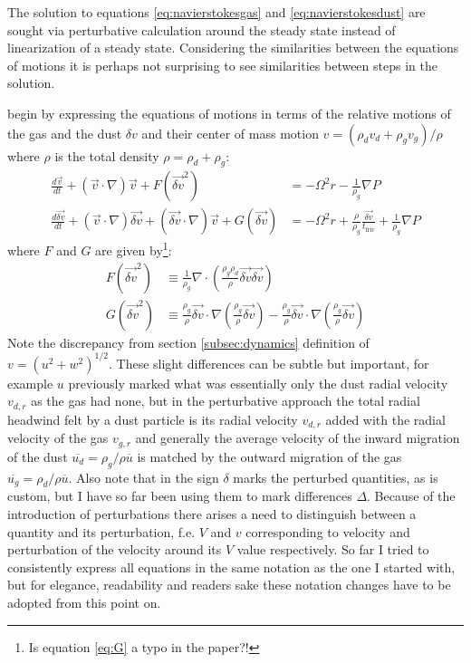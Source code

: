 \documentclass[12pt]{article}
\begin{document}
The solution to equations \ref{eq:navierstokesgas} and \ref{eq:navierstokesdust} are sought via perturbative calculation around the steady state instead of linearization of a steady state. Considering the similarities between the equations of motions it is perhaps not surprising to see similarities between steps in the solution. 

\cite{Youdin05} begin by expressing the equations of motions in terms of the relative motions of the gas and the dust $\delta v$ and their center of mass motion $v = (\rho_dv_d+\rho_gv_g)/\rho$ where $\rho$ is the total density $\rho = \rho_d+\rho_g$:
\begin{align}
    \label{eq:comnavierstokesgas}
    \frac{d \vec{v}}{dt} + (\vec{v}\cdot \nabla)\vec{v} + F(\vec{\delta v}^2) 
    &= -\Omega^2r - \frac{1}{\rho_g } \nabla P \\
    \label{eq:comnavierstokesdust}
    \frac{d \vec{\delta v}}{dt} + (\vec{v}\cdot \nabla)\vec{\delta v} + (\vec{\delta v}\cdot \nabla)\vec{v} + G(\vec{\delta v})
    &= -\Omega^2r + \frac{\rho}{\rho_g}\frac{\vec{\delta v}}{t_\mathrm{fric}} + \frac{1}{\rho_g } \nabla P
\end{align}
where $F$ and $G$ are given by\footnote{Is equation \ref{eq:G} a typo in the paper?!}:
\begin{align}
    \label{eq:F}
     F(\vec{\delta v}^2) &\equiv \frac{1}{\rho_g } \nabla \cdot \left( \frac{\rho_g\rho_d}{\rho} \vec{\delta v} \vec{\delta v} \right) \\
    \label{eq:G}
     G(\vec{\delta v}^2) &\equiv \frac{\rho_g}{\rho}\vec{\delta v} \cdot \nabla\left( \frac{\rho_g}{\rho}\vec{\delta v} \right) - \frac{\rho_g}{\rho}\vec{\delta v} \cdot \nabla\left( \frac{\rho_g}{\rho}\vec{\delta v} \right) 
\end{align}
Note the discrepancy from section \ref{subsec:dynamics} definition of $v=(u^2+w^2)^{1/2}$. These slight differences can be subtle but important, for example $u$ previously marked what was essentially only the dust radial velocity $v_{d,r}$ as the gas had none, but in the perturbative approach the total radial headwind felt by a dust particle is its radial velocity $v_{d,r}$ added with the radial velocity of the gas $v_{g,r}$ and generally the average velocity of the inward migration of the dust $\overline{u_d}=\rho_g/\rho \overline{u}$ is matched by the outward migration of the gas $\overline{u_g}=\rho_d/\rho \overline{u}$. 
Also note that in \cite{Youdin05} the sign $\delta$ marks the perturbed quantities, as is custom, but I have so far been using them to mark differences $\Delta$. Because of the introduction of perturbations there arises a need to distinguish between a quantity and its perturbation, f.e. $V$ and $v$ corresponding to velocity and perturbation of the velocity around its $V$ value respectively. So far I tried to consistently express all equations in the same notation as the one I started with, but for elegance, readability and readers sake these notation changes have to be adopted from this point on.
\end{document}
